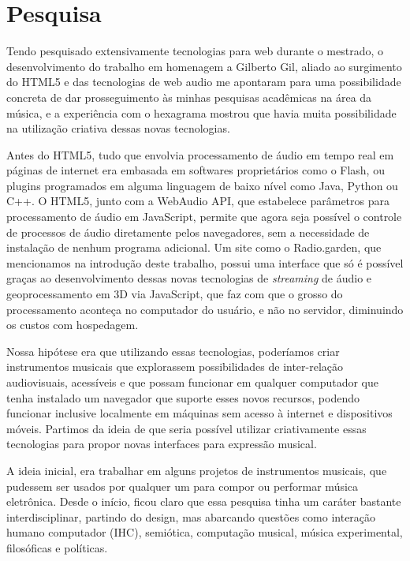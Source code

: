 

\section{Pesquisa}

    Tendo pesquisado extensivamente tecnologias para web durante o mestrado, o desenvolvimento do trabalho em homenagem a Gilberto Gil, aliado ao surgimento do HTML5 e das tecnologias de web audio me apontaram para uma possibilidade concreta de dar prosseguimento às minhas pesquisas acadêmicas na área da música, e a experiência com o hexagrama mostrou que havia muita possibilidade na utilização criativa dessas novas tecnologias. 

Antes do HTML5, tudo que envolvia processamento de áudio em tempo real em páginas de internet era embasada em softwares proprietários como o Flash, ou plugins programados em alguma linguagem de baixo nível como Java, Python ou C++. O HTML5, junto com a WebAudio API, que estabelece parâmetros para processamento de áudio em JavaScript, permite que agora seja possível o controle de processos de áudio diretamente pelos navegadores, sem a necessidade de instalação de nenhum programa adicional. Um site como o Radio.garden, que mencionamos na introdução deste trabalho, possui uma interface que só é possível graças ao desenvolvimento dessas novas tecnologias de \emph{streaming} de áudio e geoprocessamento em 3D via JavaScript, que faz com que o grosso do processamento aconteça no computador do usuário, e não no servidor, diminuindo os custos com hospedagem.

Nossa hipótese era que utilizando essas tecnologias, poderíamos criar instrumentos musicais que explorassem possibilidades de inter-relação audiovisuais, acessíveis e que possam funcionar em qualquer computador que tenha instalado um navegador que suporte esses novos recursos, podendo funcionar inclusive localmente em máquinas sem acesso à internet e dispositivos móveis. Partimos da ideia de que seria possível utilizar criativamente essas tecnologias para propor novas interfaces para expressão musical.
    
A ideia inicial, era trabalhar em alguns projetos de instrumentos musicais, que pudessem ser usados por qualquer um para compor ou performar música eletrônica. Desde o início, ficou claro que essa pesquisa tinha um caráter bastante interdisciplinar, partindo do design, mas abarcando questões como interação humano computador (IHC), semiótica, computação musical, música experimental, filosóficas e políticas.




